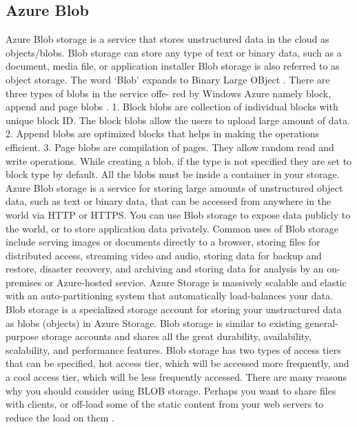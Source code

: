 {     \pv

	
\subsection{Azure Blob}

     Azure Blob storage is a service that stores unstructured data in
     the cloud as objects/blobs. Blob storage can store any type of
     text or binary data, such as a document, media file, or
     application installer Blob storage is also
     referred to as object storage. The word ‘Blob’ expands to Binary
     Large OBject \cite{www-azure-3}. There are three types of blobs in the service offe-
     red by Windows Azure namely block, append and page
     blobs \cite{www-azure-2}.
     1. Block blobs are collection of individual blocks with unique
     block ID.  The block blobs allow the users to upload large amount
     of data.
     2. Append blobs are optimized blocks that helps in making the
     operations efficient.
     3. Page blobs are compilation of pages. They allow random read
     and write operations. While creating a blob, if the type is not
     specified they are set to block type by default. All the blobs
     must be inside a container in your storage.  Azure Blob storage
     is a service for storing large amounts of unstructured object
     data, such as text or binary data, that can be accessed from
     anywhere in the world via HTTP or HTTPS. You can use Blob storage
     to expose data publicly to the world, or to store application
     data privately. Common uses of Blob storage include serving
     images or documents directly to a browser, storing files for
     distributed access, streaming video and audio, storing data for
     backup and restore, disaster recovery, and archiving and storing
     data for analysis by an on-premises or Azure-hosted service.
     Azure Storage is massively scalable and elastic with an
     auto-partitioning system that automatically load-balances your
     data. Blob storage is a specialized storage account for storing
     your unstructured data as blobs (objects) in Azure Storage. Blob
     storage is similar to existing general-purpose storage accounts
     and shares all the great durability, availability, scalability,
     and performance features. Blob storage has two types of access
     tiers that can be specified, hot access tier, which will be
     accessed more frequently, and a cool access tier, which will be
     less frequently accessed. There are many reasons why you should
     consider using BLOB storage. Perhaps you want to share files with
     clients, or off-load some of the static content from your web
     servers to reduce the load on them \cite{www-azure-3}.

}
